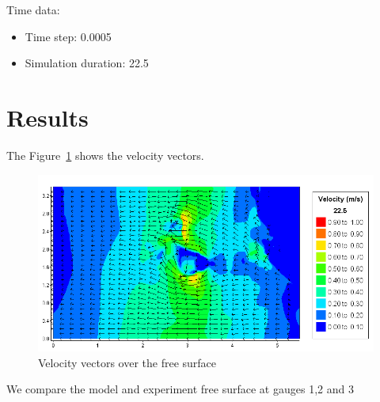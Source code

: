 Time data:
\begin{itemize}
\item Time step: 0.0005
\item Simulation duration: 22.5
\end{itemize}

\section{Results}

The Figure~\ref{fig:monai:vel} shows the velocity vectors.
\begin{figure}
\centering
\includegraphics[width=.6\textwidth]{img/vel.png}
\caption{Velocity vectors over the free surface}\label{fig:monai:vel}
\end{figure}

We compare the model and experiment free surface at gauges 1,2 and 3

